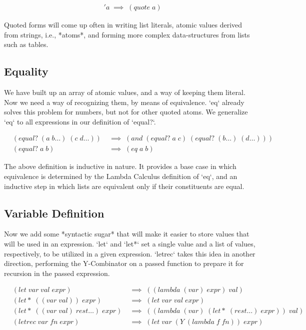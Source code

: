 \begin{align*}
& 'a \; \implies \; (quote \; a)
\end{align*}

Quoted forms will come up often in writing list literals, atomic values derived 
from strings, i.e., *atoms*, and forming more complex data-structures from lists 
such as tables.

\subsection{Equality}
We have built up an array of atomic values, and a way of keeping them literal. Now 
we need a way of recognizing them, by means of equivalence. `eq` already solves 
this problem for numbers, but not for other quoted atoms. We generalize `eq` to 
all expressions in our definition of `equal?`.

\begin{align*}
& (equal? \; (a \; b\dots) \; (c \; d\dots)) \; &\implies \; (and \; (equal? \; a \; c) \; (equal? \; (b\dots) \; (d\dots)))
\\& (equal? \; a \; b) \; &\implies \; (eq \; a \; b)
\end{align*}

The above definition is inductive in nature. It provides a base case in which 
equivalence is determined by the Lambda Calculus definition of `eq`, and an 
inductive step in which lists are equivalent only if their constituents are equal.

\subsection{Variable Definition}
Now we add some *syntactic sugar* that will make it easier to store values that 
will be used in an expression. `let` and `let*` set a single value and a list of 
values, respectively, to be utilized in a given expression. `letrec` takes this 
idea in another direction, performing the Y-Combinator on a passed function to 
prepare it for recursion in the passed expression.

\begin{align*}
& (let \; var \; val \; expr) \; &\implies \; ((lambda \; (var) \; expr) \; val)
\\& (let* \; ((var \; val)) \; expr) \; &\implies \; (let \; var \; val \; expr)
\\& (let* \; ((var \; val) \; rest\dots) \; expr) \; &\implies \; ((lambda \; (var) \; (let* \; (rest\dots) \; expr)) \; val)
\\& (letrec \; var \; fn \; expr) \; &\implies \; (let \; var \; (Y \; (lambda \; f \; fn)) \; expr)
\end{align*}

